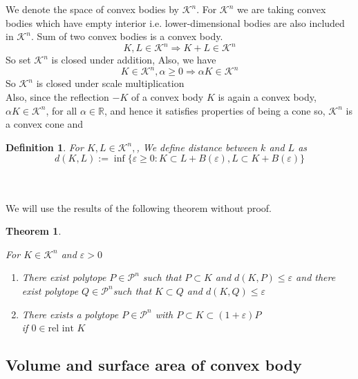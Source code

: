 \documentclass[oneside]{book}
\newtheorem{theorem}{Theorem}[section]
\newtheorem{mydef}{Definition}[section]
\begin{document}
	
	We denote  the space of convex bodies by  $\mathcal{K}^{n}$. For  $\mathcal{K}^{n}$  we are taking convex bodies which have empty interior i.e. lower-dimensional bodies are also included in $\mathcal{K}^{n}$. 
	Sum of two convex bodies is a convex body. \\
	$$
	K, L \in \mathcal{K}^{n} \Longrightarrow K+L \in \mathcal{K}^{n}
	$$ 
	So  set $\mathcal{K}^{n}$ is closed under addition,
	Also, we have
	$$ 
	K \in \mathcal{K}^{n}, \alpha \geq 0 \Longrightarrow \alpha K \in \mathcal{K}^{n}
	$$
	So  $\mathcal{K}^{n}$ is closed under scale multiplication \\
	Also, since the reflection $-K$ of a convex body $K$ is again a convex body, $\alpha K \in \mathcal{K}^{n}$, for all $\alpha \in \mathbb{R}$, and hence it satisfies properties of being a cone so,  $\mathcal{K}^{n}$ is a convex cone and 
	\begin{mydef}	 \label{d:13}
		For  $ K, L \in \mathcal{K}^{n}, $, We define distance between $k$ and $L$ as 
		\begin{equation}
		\label{eq42}
		d(K, L):=\inf \{\varepsilon \geq 0: K \subset L+B(\varepsilon), L \subset K+B(\varepsilon)\}
		\end{equation}
	\end{mydef}
	\quad 
	\\\\
	We will use the results of the following theorem without proof. 
	
	\begin{theorem}
		\label{t:8}
		
		For  $K \in \mathcal{K}^{n}$ and $\varepsilon>0$ \\
		\begin{enumerate}
			\item
			There exist  polytope $ P  \in \mathcal{P}^{n}$ such that  $P \subset K$ and  $d(K, P) \leq \varepsilon$ \newline 
			and \newline
			there exist polytope $Q \in \mathcal{P}^{n}$such that  $K \subset Q$ and $d(K, Q) \leq \varepsilon$ 
			\item 
			There exists a polytope $P \in \mathcal{P}^{n}$ with $P \subset K \subset(1+\varepsilon) P$ \\
			if $0 \in \text{rel int } K $ \label{4.1.5}
		\end{enumerate}
	\end{theorem}
	\subsection{Volume and surface area of convex body} \label{ss:19}
	
\end{document}
